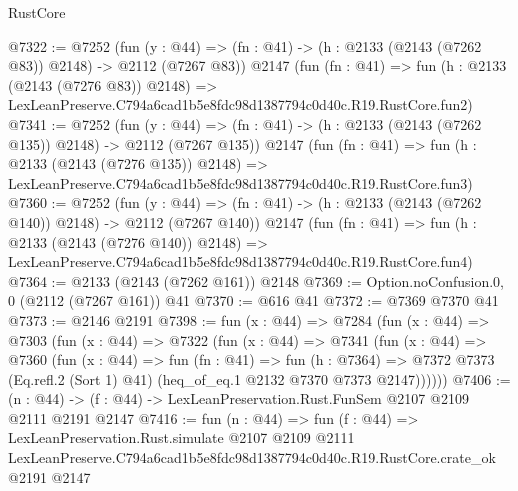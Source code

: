 \begin{lexlean}{RustCore}
\begin{coremodule}
@7322 := @7252
    (fun (y : @44) => (fn : @41) -> (h : @2133 (@2143 (@7262 @83)) @2148) -> @2112 (@7267 @83))
    @2147
    (fun (fn : @41) =>
    fun (h : @2133 (@2143 (@7276 @83)) @2148) =>
    LexLeanPreserve.C794a6cad1b5e8fdc98d1387794c0d40c.R19.RustCore.fun2)
@7341 := @7252
    (fun (y : @44) => (fn : @41) -> (h : @2133 (@2143 (@7262 @135)) @2148) -> @2112 (@7267 @135))
    @2147
    (fun (fn : @41) =>
    fun (h : @2133 (@2143 (@7276 @135)) @2148) =>
    LexLeanPreserve.C794a6cad1b5e8fdc98d1387794c0d40c.R19.RustCore.fun3)
@7360 := @7252
    (fun (y : @44) => (fn : @41) -> (h : @2133 (@2143 (@7262 @140)) @2148) -> @2112 (@7267 @140))
    @2147
    (fun (fn : @41) =>
    fun (h : @2133 (@2143 (@7276 @140)) @2148) =>
    LexLeanPreserve.C794a6cad1b5e8fdc98d1387794c0d40c.R19.RustCore.fun4)
@7364 := @2133 (@2143 (@7262 @161)) @2148
@7369 := Option.noConfusion.{0, 0} (@2112 (@7267 @161)) @41
@7370 := @616 @41
@7372 := @7369 @7370 @41
@7373 := @2146 @2191
@7398 := fun (x : @44) =>
  @7284
    (fun (x : @44) =>
    @7303
      (fun (x : @44) =>
      @7322
        (fun (x : @44) =>
        @7341
          (fun (x : @44) =>
          @7360
            (fun (x : @44) =>
            fun (fn : @41) =>
            fun (h : @7364) =>
            @7372 @7373 (Eq.refl.{2} (Sort 1) @41) (heq_of_eq.{1} @2132 @7370 @7373 @2147))))))
@7406 := (n : @44) -> (f : @44) -> LexLeanPreservation.Rust.FunSem @2107 @2109 @2111 @2191 @2147
@7416 := fun (n : @44) =>
  fun (f : @44) =>
  LexLeanPreservation.Rust.simulate
    @2107
    @2109
    @2111
    LexLeanPreserve.C794a6cad1b5e8fdc98d1387794c0d40c.R19.RustCore.crate_ok
    @2191
    @2147
\end{coremodule}
\end{lexlean}
